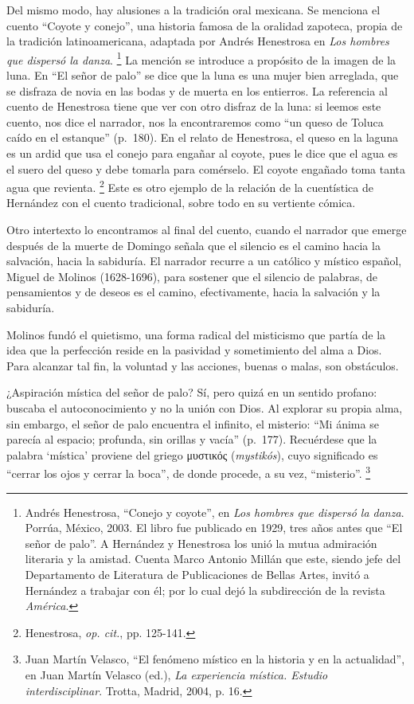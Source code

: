\documentclass[14pt,twoside,final]{extbook} %
\let\oldfootnote\footnote
\renewcommand\footnote[1]{%
\oldfootnote{\hspace{1mm}#1}}
\begin{document}
Del mismo modo, hay alusiones a la tradición oral mexicana. Se menciona el cuento ``Coyote y conejo'', una historia famosa de la oralidad zapoteca, propia de la tradición latinoamericana, adaptada por Andrés Henestrosa en \emph{Los hombres que dispersó la danza}.\footnote{Andrés Henestrosa, ``Conejo y coyote'', en \emph{Los hombres que dispersó la danza}. Porrúa, México, 2003. El libro fue publicado en 1929, tres años antes que ``El señor de palo''. A Hernández y Henestrosa los unió la mutua admiración literaria y la amistad. Cuenta Marco Antonio Millán que este, siendo jefe del Departamento de Literatura de Publicaciones de Bellas Artes, invitó a Hernández a trabajar con él; por lo cual dejó la subdirección de la revista \emph{América}.} La mención se introduce a propósito de la imagen de la luna. En ``El señor de palo'' se dice que la luna es una mujer bien arreglada, que se disfraza de novia en las bodas y de muerta en los entierros. La referencia al cuento de Henestrosa tiene que ver con otro disfraz de la luna: si leemos este cuento, nos dice el narrador, nos la encontraremos como ``un queso de Toluca caído en el estanque'' (p.~180). En el relato de Henestrosa, el queso en la laguna es un ardid que usa el conejo para engañar al coyote, pues le dice que el agua es el suero del queso y debe tomarla para comérselo. El coyote engañado toma tanta agua que revienta.\footnote{Henestrosa, \emph{op. cit.}, pp. 125-141.} Este es otro ejemplo de la relación de la cuentística de Hernández con el cuento tradicional, sobre todo en su vertiente cómica.

Otro intertexto lo encontramos al final del cuento, cuando el narrador que emerge después de la muerte de Domingo señala que el silencio es el camino hacia la salvación, hacia la sabiduría. El narrador recurre a un católico y místico español, Miguel de Molinos (1628-1696), para sostener que el silencio de palabras, de pensamientos y de deseos es el camino, efectivamente, hacia la salvación y la sabiduría.

Molinos fundó el quietismo, una forma radical del misticismo que partía de la idea que la perfección reside en la pasividad y sometimiento del alma a Dios. Para alcanzar tal fin, la voluntad y las acciones, buenas o malas, son obstáculos.

¿Aspiración mística del señor de palo? Sí, pero quizá en un sentido profano: buscaba el autoconocimiento y no la unión con Dios. Al explorar su propia alma, sin embargo, el señor de palo encuentra el infinito, el misterio: ``Mi ánima se parecía al espacio; profunda, sin orillas y vacía'' (p.~177). Recuérdese que la palabra `mística' proviene del griego \textgreek{μυστικός} (\emph{mystikós}), cuyo significado es ``cerrar los ojos y cerrar la boca'', de donde procede, a su vez, ``misterio''.\footnote{Juan Martín Velasco, ``El fenómeno místico en la historia y en la actualidad'', en Juan Martín Velasco (ed.), \emph{La experiencia mística. Estudio interdisciplinar}. Trotta, Madrid, 2004, p. 16.}
\end{document}
